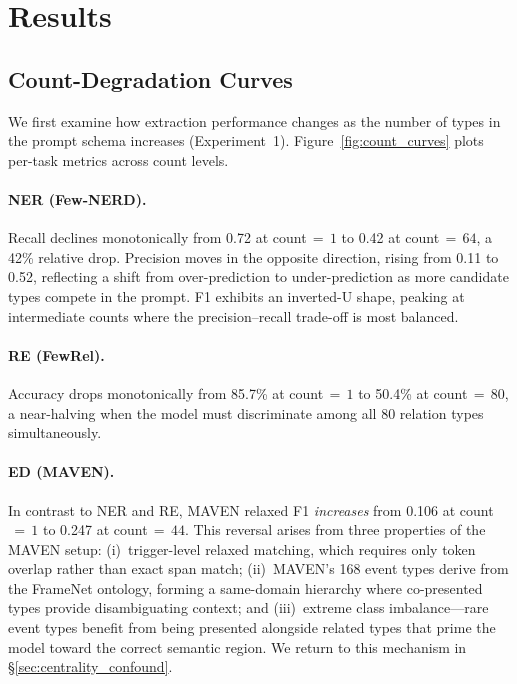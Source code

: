 \section{Results}
\label{sec:results}

\subsection{Count-Degradation Curves}
\label{sec:count_curves}

We first examine how extraction performance changes as the number of types in the prompt schema increases (Experiment~1). Figure~\ref{fig:count_curves} plots per-task metrics across count levels.

\paragraph{NER (Few-NERD).}
Recall declines monotonically from 0.72 at count${}\,=\,1$ to 0.42 at count${}\,=\,64$, a 42\% relative drop. Precision moves in the opposite direction, rising from 0.11 to 0.52, reflecting a shift from over-prediction to under-prediction as more candidate types compete in the prompt. F1 exhibits an inverted-U shape, peaking at intermediate counts where the precision--recall trade-off is most balanced.

\paragraph{RE (FewRel).}
Accuracy drops monotonically from 85.7\% at count${}\,=\,1$ to 50.4\% at count${}\,=\,80$, a near-halving when the model must discriminate among all 80 relation types simultaneously.

\paragraph{ED (MAVEN).}
In contrast to NER and RE, MAVEN relaxed F1 \emph{increases} from 0.106 at count${}\,=\,1$ to 0.247 at count${}\,=\,44$. This reversal arises from three properties of the MAVEN setup: (i)~trigger-level relaxed matching, which requires only token overlap rather than exact span match; (ii)~MAVEN's 168 event types derive from the FrameNet ontology, forming a same-domain hierarchy where co-presented types provide disambiguating context; and (iii)~extreme class imbalance---rare event types benefit from being presented alongside related types that prime the model toward the correct semantic region. We return to this mechanism in \S\ref{sec:centrality_confound}.

